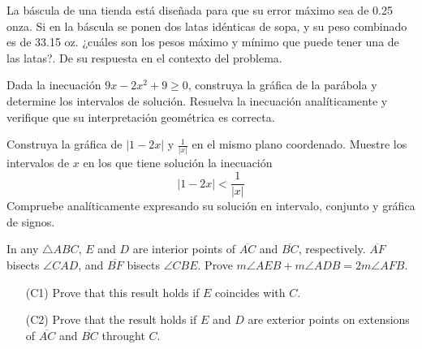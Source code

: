 \documentclass[a4 paper]{article}
\begin{document}
 La báscula de una tienda está diseñada para que su error máximo sea de 0.25 onza. Si en la báscula se ponen dos latas idénticas de sopa, y su peso combinado es de 33.15 oz. ¿cuáles son los pesos máximo y mínimo que puede tener una de las latas?. De su respuesta en el contexto del problema.
\vskip 3mm
\solution{}
\vspace{30mm}

  Dada la inecuación $9x - 2x^2 + 9 \geq 0$, construya la gráfica de la parábola y determine los intervalos de solución. Resuelva la inecuación analíticamente y verifique que su interpretación geométrica es correcta.
\vskip 3mm
\solution{}
\vspace{30mm}

  Construya la gráfica de $|1 - 2x|$ y $\frac{1}{|x|}$ en el mismo plano coordenado. Muestre los intervalos de $x$ en los que tiene solución la inecuación
\[
  |1 - 2x| < \frac{1}{|x|}
\]
Compruebe analíticamente expresando su solución en intervalo, conjunto y gráfica de signos.
\vskip 3mm
\solution{}
\vspace{30mm}

  In any $\triangle ABC$, $E$ and $D$ are interior points of $\overline{AC}$ and $\overline{BC}$, respectively. $\overline{AF}$ bisects $\angle CAD$, and $\overline{BF}$ bisects $\angle CBE$. Prove $m\angle AEB + m\angle ADB = 2m\angle AFB$.
\begin{itemize}
    \item[(C1)] Prove that this result holds if $E$ coincides with $C$.
    \item[(C2)] Prove that the result holds if $E$ and $D$ are exterior points on extensions of $\overline{AC}$ and $\overline{BC}$ throught $C$.
\end{itemize}
\begin{figure}[ht]
    \centering
\end{figure}
\end{document}
